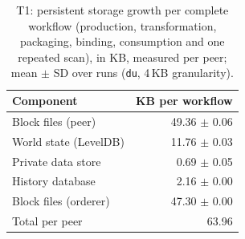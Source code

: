 \begin{table}[t]
\centering\small
\caption{T1: persistent storage growth per complete workflow (production, transformation, packaging, binding, consumption and one repeated scan), in KB, measured per peer; mean $\pm$ SD over runs (\texttt{du}, 4\,KB granularity).}
\label{tab:t1-storage}
\begin{tabular}{lr}
\toprule
Component & KB per workflow \\
\midrule
Block files (peer) & 49.36 $\pm$ 0.06 \\
World state (LevelDB) & 11.76 $\pm$ 0.03 \\
Private data store & 0.69 $\pm$ 0.05 \\
History database & 2.16 $\pm$ 0.00 \\
Block files (orderer) & 47.30 $\pm$ 0.00 \\
\midrule
Total per peer & 63.96 \\
\bottomrule
\end{tabular}
\end{table}
